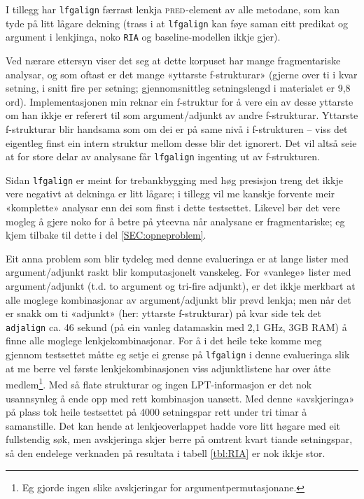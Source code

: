 \documentclass[11pt,a4paper,oneside,draft]{report}
\newcommand{\F}[2]{\textsc{#1}\ensuremath{_{#2}}}
\newcommand{\PRED}{\F{pred}{}}
\begin{document}
 I tillegg har \texttt{lfgalign} færrast lenkja \PRED{}-element av alle
 metodane, som kan tyde på litt lågare dekning (trass i at \texttt{lfgalign}
 kan føye saman eitt predikat og argument i lenkjinga, noko \texttt{RIA} og
 baseline-modellen ikkje gjer).

 Ved nærare ettersyn viser det seg at dette korpuset har mange
 fragmentariske analysar, og som oftast er det mange «yttarste
 f-strukturar» (gjerne over ti i kvar setning, i snitt fire per
 setning; gjennomsnittleg setningslengd i materialet er 9,8
 ord). Implementasjonen min reknar ein f-struktur for å vere ein av
 desse yttarste om han ikkje er referert til som argument/adjunkt av
 andre f-strukturar. Yttarste f-strukturar blir handsama som om dei er
 på same nivå i f-strukturen -- viss det eigentleg finst ein intern
 struktur mellom desse blir det ignorert. Det vil altså seie at for
 store delar av analysane får \texttt{lfgalign} ingenting ut av f-strukturen.

 Sidan \texttt{lfgalign} er meint for trebankbygging med høg presisjon treng
 det ikkje vere negativt at dekninga er litt lågare; i tillegg vil me
 kanskje forvente meir «komplette» analysar enn dei som finst i dette
 testsettet. Likevel bør det vere mogleg å gjere noko for å betre på
 yteevna når analysane er fragmentariske; eg kjem tilbake til dette i
 del \ref{SEC:opneproblem}.

 Eit anna problem som blir tydeleg med denne evalueringa er at lange
 lister med argument/adjunkt raskt blir komputasjonelt vanskeleg. For
 «vanlege» lister med argument/adjunkt (t.d. to argument og tri-fire
 adjunkt), er det ikkje merkbart at alle moglege kombinasjonar av
 argument/adjunkt blir prøvd lenkja; men når det er snakk om ti
 «adjunkt» (her: yttarste f-strukturar) på kvar side tek det
 \texttt{adjalign} ca. 46 sekund (på ein vanleg datamaskin med 2,1 GHz, 3GB
 RAM) å finne alle moglege lenkjekombinasjonar. For å i det heile teke
 komme meg gjennom testsettet måtte eg setje ei grense på \texttt{lfgalign} i
 denne evalueringa slik at me berre vel første lenkjekombinasjonen
 viss adjunktlistene har over åtte medlem\footnote{Eg gjorde ingen slike avskjeringar for argumentpermutasjonane. }. Med så flate
 strukturar og ingen LPT-informasjon er det nok usannsynleg å ende opp
 med rett kombinasjon uansett. Med denne «avskjeringa» på plass tok
 heile testsettet på 4000 setningspar rett under tri timar å
 samanstille. Det kan hende at lenkjeoverlappet hadde vore litt høgare
 med eit fullstendig søk, men avskjeringa skjer berre på omtrent kvart
 tiande setningspar, så den endelege verknaden på resultata i tabell
 \ref{tbl:RIA} er nok ikkje stor.
\end{document}
